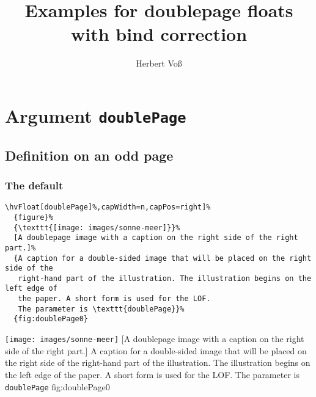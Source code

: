 \documentclass[twoside,twocolumn]{scrartcl}
\makeatletter
\let\hvBlindtext\Blindtext
\def\Blindtext{\par\color{black!40}\hvBlindtext\par\normalcolor}
\def\hvblindtext{\textcolor{black!40}{\blindtext@text}}
\makeatother
\begin{document}
\title{Examples for doublepage floats \newline with bind correction}
\author{Herbert Voß}
\maketitle

\tableofcontents


\onecolumn
\listoffigures

\newpage\null
\twocolumn
\section{Argument \texttt{doublePage}}
\subsection{Definition on an odd page}

\Blindtext\hvblindtext

\hvblindtext

\subsubsection{The default}


\begin{lstlisting}
\hvFloat[doublePage]%,capWidth=n,capPos=right]%
  {figure}%
  {\texttt{[image: images/sonne-meer]}}%
  [A doublepage image with a caption on the right side of the right part.]%
  {A caption for a double-sided image that will be placed on the right side of the
   right-hand part of the illustration. The illustration begins on the left edge of 
   the paper. A short form is used for the LOF. 
   The parameter is \texttt{doublePage}}%
  {fig:doublePage0}
\end{lstlisting}


\hvFloat[doublePage]%
  {figure}%
  {\texttt{[image: images/sonne-meer]}}%
  [A doublepage image with a caption on the right side of the right part.]%
  {A caption for a double-sided image that will be placed on the right side of the
   right-hand part of the illustration. The illustration begins on the left edge of 
   the paper. A short form is used for the LOF. 
   The parameter is \texttt{doublePage}}%
  {fig:doublePage0}

\Blindtext

\Blindtext

\Blindtext
\end{document}
